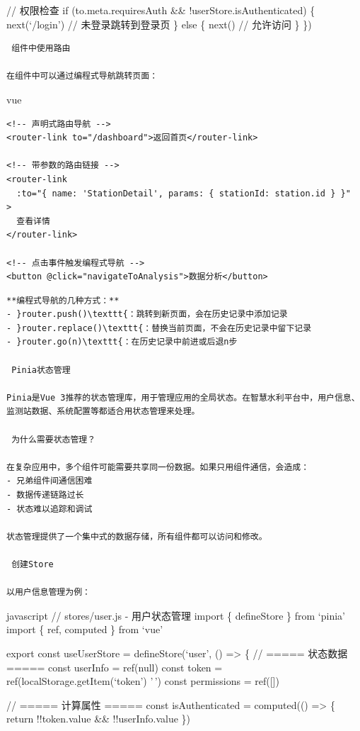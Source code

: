 {{// 权限检查 if (to.meta.requiresAuth \&\& !userStore.isAuthenticated) \{ next(`/login') // 未登录跳转到登录页 \} else \{ next() // 允许访问 \} \})

\begin{lstlisting}
 组件中使用路由

在组件中可以通过编程式导航跳转页面：
\end{lstlisting}

vue

\begin{verbatim}
<!-- 声明式路由导航 -->
<router-link to="/dashboard">返回首页</router-link>

<!-- 带参数的路由链接 -->
<router-link 
  :to="{ name: 'StationDetail', params: { stationId: station.id } }"
>
  查看详情
</router-link>

<!-- 点击事件触发编程式导航 -->
<button @click="navigateToAnalysis">数据分析</button>
\end{verbatim}

\begin{lstlisting}
**编程式导航的几种方式：**
- }router.push()\texttt{：跳转到新页面，会在历史记录中添加记录
- }router.replace()\texttt{：替换当前页面，不会在历史记录中留下记录  
- }router.go(n)\texttt{：在历史记录中前进或后退n步

 Pinia状态管理

Pinia是Vue 3推荐的状态管理库，用于管理应用的全局状态。在智慧水利平台中，用户信息、监测站数据、系统配置等都适合用状态管理来处理。

 为什么需要状态管理？

在复杂应用中，多个组件可能需要共享同一份数据。如果只用组件通信，会造成：
- 兄弟组件间通信困难
- 数据传递链路过长
- 状态难以追踪和调试

状态管理提供了一个集中式的数据存储，所有组件都可以访问和修改。

 创建Store

以用户信息管理为例：
\end{lstlisting}

javascript // stores/user.js - 用户状态管理 import \{ defineStore \} from `pinia' import \{ ref, computed \} from `vue'

export const useUserStore = defineStore(`user', () =\textgreater{} \{ // ===== 状态数据 ===== const userInfo = ref(null) const token = ref(localStorage.getItem(`token') \textbar\textbar{} '\,') const permissions = ref({[}{]})

// ===== 计算属性 ===== const isAuthenticated = computed(() =\textgreater{} \{ return !!token.value \&\& !!userInfo.value \})

}}
